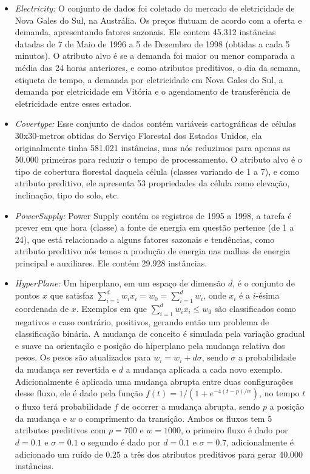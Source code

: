\begin{itemize}
\item{\textit{Electricity:}} O conjunto de dados foi coletado do mercado de eletricidade de Nova
Gales do Sul, na Austrália. Os preços flutuam de acordo com a oferta e demanda, apresentando
fatores sazonais. Ele contem 45.312 instâncias datadas de 7 de Maio de 1996 a 5 de Dezembro de
1998 (obtidas a cada 5 minutos). O atributo alvo é se a demanda foi maior ou menor comparada a média das 24 horas anteriores, e como atributos preditivos, o dia da semana, etiqueta de tempo, a demanda por eletricidade em Nova Gales do Sul, a demanda por eletricidade em Vitória e o agendamento de transferência de eletricidade entre esses estados.

\item{\textit{Covertype:}} Esse conjunto de dados contém variáveis cartográficas de células
30x30-metros obtidas do Serviço Florestal dos Estados Unidos, ela originalmente tinha 581.021
instâncias, mas nós reduzimos para apenas as 50.000 primeiras para reduzir o tempo de
processamento. O atributo alvo é o tipo de cobertura florestal daquela célula (classes variando
de 1 a 7), e como atributo preditivo, ele apresenta 53 propriedades da célula como elevação, inclinação, tipo do solo, etc.

\item{\textit{PowerSupply:}} Power Supply contém os registros de 1995 a 1998, a tarefa é prever
em que hora (classe) a fonte de energia em questão pertence (de 1 a 24), que está relacionado a
alguns fatores sazonais e tendências, como atributo preditivo nós temos a produção de energia
nas malhas de energia principal e auxiliares. Ele contém 29.928 instâncias.

\item{\textit{HyperPlane:}} Um hiperplano, em um espaço de dimensão $d$, é o conjunto de pontos
$x$ que satisfaz $\sum^{d}_{i=1} w_i x_i = w_0 = \sum^{d}_{i=1} w_i$, onde $x_i$ é a $i$-ésima
coordenada de $x$. Exemplos em que $\sum^{d}_{i=1} w_i x_i \leq w_0$ são classificados como
negativos e caso contrário, positivos, gerando então um problema de classificação binária.
A mudança de conceito é simulada pela variação gradual e suave na orientação e posição do
hiperplano pela mudança relativa dos pesos. Os pesos são atualizados para $w_i = w_i + d\sigma$,
sendo $\sigma$ a probabilidade da mudança ser revertida e $d$ a mudança aplicada a cada novo
exemplo. Adicionalmente é aplicada uma mudança abrupta entre duas configurações desse fluxo,
ele é dado pela função $f(t) = 1/(1+e^{-4(t-p)/w})$, no tempo $t$ o fluxo terá probabilidade
$f$ de ocorrer a mudança abrupta, sendo $p$ a posição da mudança e $w$ o comprimento da
transição. Ambos os fluxos tem 5 atributos preditivos com $p=700$ e $w=1000$, o primeiro fluxo
é dado por $d=0.1$ e $\sigma=0.1$ o segundo é dado por $d=0.1$ e $\sigma=0.7$, adicionalmente é
adicionado um ruído de $0.25$ a três dos atributos preditivos para gerar 40.000 instâncias.


\end{itemize}
